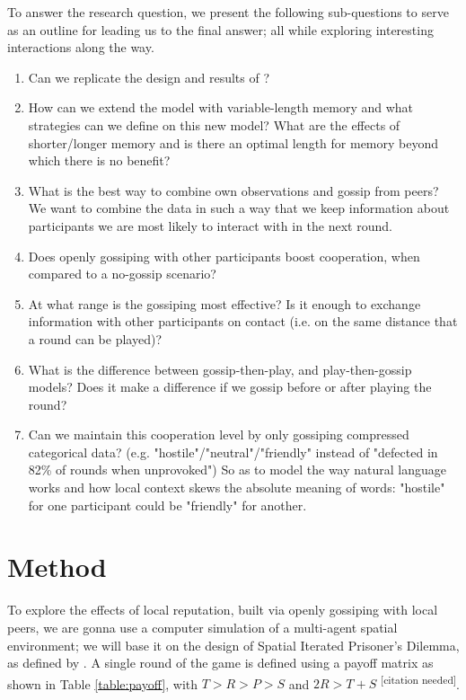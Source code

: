 \documentclass[english]{article}
\newcommand{\citationneeded}{\textsuperscript{\color{blue} [citation needed]}}
\begin{document}
To answer the research question, we present the following sub-questions to serve as an outline for leading us to the final answer; all while exploring interesting interactions along the way.
\begin{enumerate}
  \item Can we replicate the design and results of \citet{smaldino}?
  \item How can we extend the model with variable-length memory and what strategies can we define on this new model? What are the effects of shorter/longer memory and is there an optimal length for memory beyond which there is no benefit?
  \item What is the best way to combine own observations and gossip from peers? We want to combine the data in such a way that we keep information about participants we are most likely to interact with in the next round.
  \item Does openly gossiping with other participants boost cooperation, when compared to a no-gossip scenario?
  \item At what range is the gossiping most effective? Is it enough to exchange information with other participants on contact (i.e. on the same distance that a round can be played)?
  \item What is the difference between gossip-then-play, and play-then-gossip models? Does it make a difference if we gossip before or after playing the round?
  \item Can we maintain this cooperation level by only gossiping compressed categorical data? (e.g. "hostile"/"neutral"/"friendly" instead of "defected in 82\% of rounds when unprovoked") So as to model the way natural language works and how local context skews the absolute meaning of words: "hostile" for one participant could be "friendly" for another.
\end{enumerate}



\section*{Method}
To explore the effects of local reputation, built via openly gossiping with local peers, we are gonna use a computer simulation of a multi-agent spatial environment; we will base it on the design of Spatial Iterated Prisoner’s Dilemma, as defined by \citet{smaldino}.
A single round of the game is defined using a payoff matrix as shown in Table \ref{table:payoff}, with $T > R > P > S$ and $2R > T + S$ \citationneeded.
\end{document}
